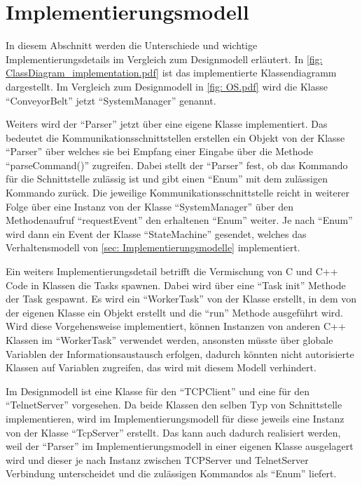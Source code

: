 \documentclass[./\jobname.tex]{subfiles}
\begin{document}
\section{Implementierungsmodell}
%
In diesem Abschnitt werden die Unterschiede und wichtige Implementierungsdetails im Vergleich zum Designmodell erläutert.
In \autoref{fig: ClassDiagram_implementation.pdf} ist das implementierte Klassendiagramm dargestellt. Im Vergleich zum Designmodell in \autoref{fig: OS.pdf} wird die Klasse \enquote{ConveyorBelt} jetzt \enquote{SystemManager} genannt.\par
%
Weiters wird der \enquote{Parser} jetzt über eine eigene Klasse implementiert. Das bedeutet die Kommunikationsschnittstellen erstellen ein Objekt von der Klasse \enquote{Parser} über welches sie bei Empfang einer Eingabe über die Methode \enquote{parseCommand()} zugreifen. Dabei stellt der \enquote{Parser} fest, ob das Kommando für die Schnittstelle zulässig ist und gibt einen \enquote{Enum} mit dem zulässigen Kommando zurück. Die jeweilige Kommunikationsschnittstelle reicht in weiterer Folge über eine Instanz von der Klasse \enquote{SystemManager} über den Methodenaufruf \enquote{requestEvent} den erhaltenen \enquote{Enum} weiter. Je nach \enquote{Enum} wird dann ein Event der Klasse \enquote{StateMachine} gesendet, welches das Verhaltensmodell von \autoref{sec: Implementierungsmodelle} implementiert.\par
%
Ein weiters Implementierungsdetail betrifft die Vermischung von C und C++ Code in Klassen die Tasks spawnen. Dabei wird über eine \enquote{Task init} Methode der Task gespawnt. Es wird ein \enquote{WorkerTask} von der Klasse erstellt, in dem von der eigenen Klasse ein Objekt erstellt und die \enquote{run} Methode ausgeführt wird. Wird diese Vorgehensweise implementiert, können Instanzen von anderen C++ Klassen im \enquote{WorkerTask} verwendet werden, ansonsten müsste über globale Variablen der Informationsaustausch erfolgen, dadurch könnten nicht autorisierte Klassen auf Variablen zugreifen, das wird mit diesem Modell verhindert.\par
%
Im Designmodell ist eine Klasse für den \enquote{TCPClient} und eine für den \enquote{TelnetServer} vorgesehen. Da beide Klassen den selben Typ von Schnittstelle implementieren, wird im Implementierungsmodell für diese jeweils eine Instanz von der Klasse \enquote{TcpServer} erstellt. Das kann auch dadurch realisiert werden, weil der \enquote{Parser} im Implementierungsmodell in einer eigenen Klasse ausgelagert wird und dieser je nach Instanz zwischen TCPServer und TelnetServer Verbindung unterscheidet und die zulässigen Kommandos als \enquote{Enum} liefert.\par
\end{document}
